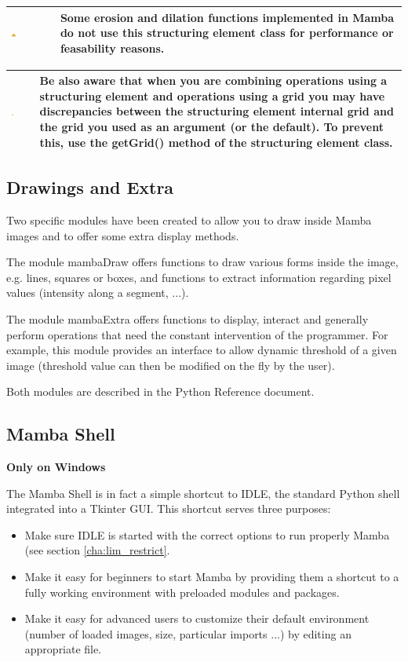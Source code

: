 \documentclass[a4paper,10pt,oneside]{article}
\newenvironment{warnBox}
{
    \begin{center}
    \begin{tabular}{ | b{0.1\textwidth} b{0.8\textwidth} | }
    \hline
    \rowcolor{yellow}
    \includegraphics[width=0.1\textwidth]{Crystal_Clear_app_error.png} &
}
{
    \\
    \hline
    \end{tabular}
    \end{center}
}
\begin{document}
\begin{warnBox}
Some erosion and dilation functions implemented in Mamba do not use this
structuring element class for performance or feasability reasons.
\end{warnBox}

\begin{warnBox}
Be also aware that when you are combining operations using a structuring element
and operations using a grid you may have discrepancies between the structuring
element internal grid and the grid you used as an argument (or the default). To
prevent this, use the getGrid() method of the structuring element class.
\end{warnBox}

\subsection{Drawings and Extra}
\label{cha:draw_extra}

Two specific modules have been created to allow you to draw inside Mamba images
and to offer some extra display methods.

The module mambaDraw offers functions to draw various forms inside the image, 
e.g. lines, squares or boxes, and functions to extract information regarding pixel
values (intensity along a segment, ...).

The module mambaExtra offers functions to display, interact and generally 
perform operations that need the constant intervention of the programmer. For
example, this module provides an interface to allow dynamic threshold of a given
image (threshold value can then be modified on the fly by the user).

Both modules are described in the Python Reference document.

\subsection{Mamba Shell}
\label{cha:mamba_shell}

\textbf{Only on Windows}

The Mamba Shell is in fact a simple shortcut to IDLE, the standard Python shell
integrated into a Tkinter GUI. This shortcut serves three purposes:

\begin{itemize}
\item Make sure IDLE is started with the correct options to run properly Mamba
(see section \ref{cha:lim_restrict}.
\item Make it easy for beginners to start Mamba by providing them a shortcut
to a fully working environment with preloaded modules and packages.
\item Make it easy for advanced users to customize their default environment
(number of loaded images, size, particular imports ...) by editing an appropriate
file.
\end{itemize}
\end{document}

